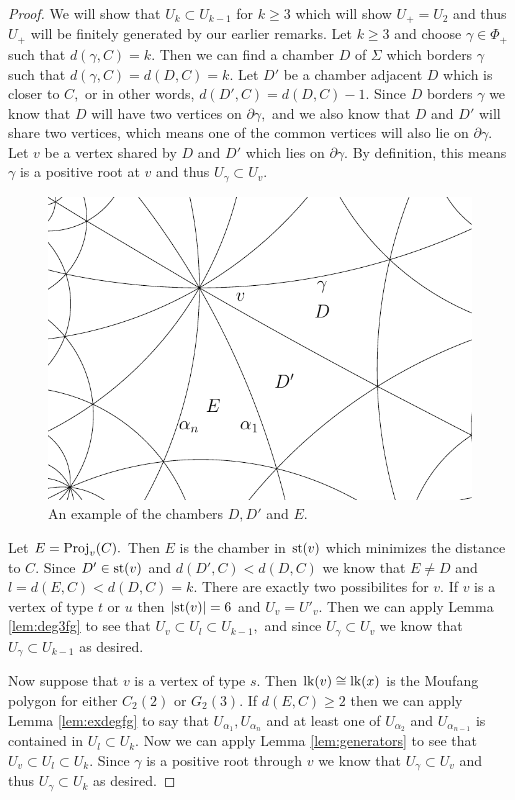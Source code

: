 \documentclass[class=book, crop=false]{standalone}
\begin{document}
\begin{proof}
	We will show that $U_k\subset U_{k-1}$ for $k\ge 3$ which will show $U_+=U_2$ and thus $U_+$ will be finitely generated by our earlier remarks. Let $k\ge 3$ and choose $\gamma\in \Phi_+$ such that $d(\gamma,C)=k.$ Then we can find a chamber $D$ of $\Sigma$ which borders $\gamma$ such that $d(\gamma,C)=d(D,C)=k.$ Let $D'$ be a chamber adjacent $D$ which is closer to $C,$ or in other words, $d(D',C)=d(D,C)-1.$ Since $D$ borders $\gamma$ we know that $D$ will have two vertices on $\partial \gamma,$ and we also know that $D$ and $D'$ will share two vertices, which means one of the common vertices will also lie on $\partial\gamma.$ Let $v$ be a vertex shared by $D$ and $D'$ which lies on $\partial \gamma.$ By definition, this means $\gamma$ is a positive root at $v$ and thus $U_\gamma\subset U_v.$

	\begin{figure}[h]
	\begin{center}
		\includegraphics[width=3.5 in]{diagrams/vdef.pdf}
	\end{center}	
	\caption{An example of the chambers $D,D'$ and $E.$}
		\label{fig:vdef}
	\end{figure}

	Let $E=\mathrm{Proj}_v(C).$ Then $E$ is the chamber in $\mathrm{st}(v)$ which minimizes the distance to $C.$ Since $D'\in \mathrm{st}(v)$ and $d(D',C)<d(D,C)$ we know that $E\neq D$ and $l=d(E,C)<d(D,C)=k.$ There are exactly two possibilites for $v.$ If $v$ is a vertex of type $t$ or $u$ then $|\mathrm{st}(v)|=6$ and $U_v=U'_v.$ Then we can apply Lemma \ref{lem:deg3fg} to see that $U_v\subset U_l\subset U_{k-1},$ and since $U_\gamma \subset U_v$ we know that $U_\gamma \subset U_{k-1}$ as desired.

	Now suppose that $v$ is a vertex of type $s.$ Then $\mathrm{lk}(v)\cong \mathrm{lk}(x)$ is the Moufang polygon for either $C_2(2)$ or $G_2(3).$ If $d(E,C)\ge 2$ then we can apply Lemma \ref{lem:exdegfg} to say that $U_{\alpha_1},U_{\alpha_n}$ and at least one of $U_{\alpha_2}$ and $U_{\alpha_{n-1}}$ is contained in $U_l\subset U_k.$ Now we can apply Lemma \ref{lem:generators} to see that $U_v\subset U_l\subset U_k.$ Since $\gamma$ is a positive root through $v$ we know that $U_\gamma \subset U_v$ and thus $U_\gamma\subset U_k$ as desired.


\end{proof}
\end{document}
